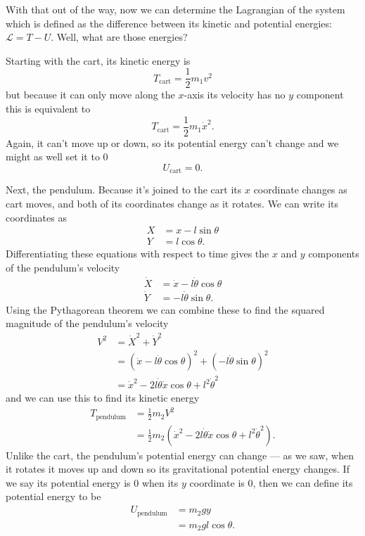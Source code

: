 \documentclass{article}
\begin{document}
With that out of the way, now we can determine the Lagrangian of the system which is defined as the difference between its kinetic and potential energies: $\mathcal{L} = T - U$. Well, what are those energies?

Starting with the cart, its kinetic energy is \[T_\text{cart} = \frac{1}{2} m_1 v^2\] but because it can only move along the $x$-axis its velocity has no $y$ component this is equivalent to \[T_\text{cart} = \frac{1}{2} m_1 \dot{x}^2.\] Again, it can't move up or down, so its potential energy can't change and we might as well set it to $0$ \[U_\text{cart} = 0.\]

Next, the pendulum. Because it's joined to the cart its $x$ coordinate changes as cart moves, and both of its coordinates change as it rotates. We can write its coordinates as \begin{align*}
  X & = x - l \sin \theta \\
  Y & = l \cos \theta.
\end{align*} Differentiating these equations with respect to time gives the $x$ and $y$ components of the pendulum's velocity \begin{align*}
  \dot{X} & = \dot{x} - l \dot{\theta} \cos \theta \\
  \dot{Y} & = -l \dot{\theta} \sin \theta.
\end{align*} Using the Pythagorean theorem we can combine these to find the squared magnitude of the pendulum's velocity \begin{align*}
  V^2 & = \dot{X}^2 + \dot{Y}^2                                                      \\
      & = (\dot{x} - l \dot{\theta} \cos \theta)^2 + (-l \dot{\theta} \sin \theta)^2 \\
      & = \dot{x}^2 - 2 l \dot{\theta} \dot{x} \cos \theta + l^2 \dot{\theta}^2
\end{align*}
and we can use this to find its kinetic energy \begin{align*}
T_\text{pendulum} & = \frac{1}{2} m_2 V^2                                                                          \\
                    & = \frac{1}{2} m_2 (\dot{x}^2 - 2 l \dot{\theta} \dot{x} \cos \theta + l^2 \dot{\theta}^2).
\end{align*} Unlike the cart, the pendulum's potential energy can change — as we saw, when it rotates it moves up and down so its gravitational potential energy changes. If we say its potential energy is $0$ when its $y$ coordinate is $0$, then we can define its potential energy to be \begin{align*}
  U_\text{pendulum} & = m_2 g y              \\
                    & = m_2 g l \cos \theta.
\end{align*}
\end{document}
